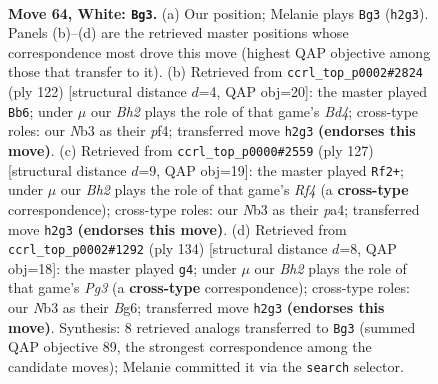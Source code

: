 \documentclass[11pt]{article}
\begin{document}
\clearpage

\begin{figure}[p]\centering
\begin{subfigure}{0.46\textwidth}\centering
\resizebox{\linewidth}{!}{%
\newchessgame
\chessboard[
  setfen={7k/2P5/2r5/8/8/1N6/4K2B/8 w - - 41 64},
  showmover=false,
  pgfstyle=straightmove, color=movearrow, markmove={h2-g3}
]}
\caption{}
\end{subfigure}\hfill
\begin{subfigure}{0.46\textwidth}\centering
\resizebox{\linewidth}{!}{%
\newchessgame
\chessboard[
  setfen={r7/P7/4k3/8/3B1p2/8/8/5K2 w - - 9 62},
  showmover=false,
  pgfstyle=straightmove, color=movearrow, markmove={d4-b6}
]}
\caption{}
\end{subfigure}
\\[4pt]
\begin{subfigure}{0.46\textwidth}\centering
\resizebox{\linewidth}{!}{%
\newchessgame
\chessboard[
  setfen={6k1/8/4R3/4pr2/P7/8/3K4/8 b - - 3 64},
  showmover=false,
  pgfstyle=straightmove, color=movearrow, markmove={f5-f2}
]}
\caption{}
\end{subfigure}\hfill
\begin{subfigure}{0.46\textwidth}\centering
\resizebox{\linewidth}{!}{%
\newchessgame
\chessboard[
  setfen={8/8/6B1/r7/P7/6P1/3k2K1/8 w - - 0 68},
  showmover=false,
  pgfstyle=straightmove, color=movearrow, markmove={g3-g4}
]}
\caption{}
\end{subfigure}
\caption{\textbf{Move 64, White: \texttt{Bg3}.} (a) Our position; Melanie plays \texttt{Bg3} (\texttt{h2g3}). Panels (b)--(d) are the retrieved master positions whose correspondence most drove this move (highest QAP objective among those that transfer to it). (b) Retrieved from \texttt{ccrl\_top\_p0002\#2824} (ply 122) [structural distance $d$=4, QAP obj=20]: the master played \texttt{Bb6}; under $\mu$ our \emph{Bh2} plays the role of that game's \emph{Bd4}; cross-type roles: our \emph{N}b3 as their \emph{p}f4; transferred move \texttt{h2g3} \textbf{(endorses this move)}. (c) Retrieved from \texttt{ccrl\_top\_p0000\#2559} (ply 127) [structural distance $d$=9, QAP obj=19]: the master played \texttt{Rf2+}; under $\mu$ our \emph{Bh2} plays the role of that game's \emph{Rf4} (a \textbf{cross-type} correspondence); cross-type roles: our \emph{N}b3 as their \emph{p}a4; transferred move \texttt{h2g3} \textbf{(endorses this move)}. (d) Retrieved from \texttt{ccrl\_top\_p0002\#1292} (ply 134) [structural distance $d$=8, QAP obj=18]: the master played \texttt{g4}; under $\mu$ our \emph{Bh2} plays the role of that game's \emph{Pg3} (a \textbf{cross-type} correspondence); cross-type roles: our \emph{N}b3 as their \emph{B}g6; transferred move \texttt{h2g3} \textbf{(endorses this move)}. Synthesis: 8 retrieved analogs transferred to \texttt{Bg3} (summed QAP objective 89, the strongest correspondence among the candidate moves); Melanie committed it via the \texttt{search} selector.}
\label{fig:thought-m126}
\end{figure}
\end{document}
